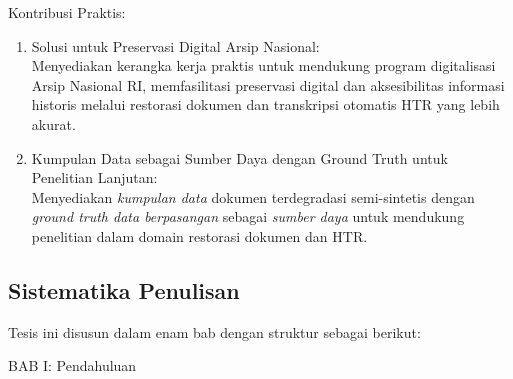 \documentclass[12pt,a4paper]{book}
\begin{document}
\vspace{0.5em}



Kontribusi Praktis:
\begin{enumerate}[label=\arabic*., leftmargin=1cm]
    \item Solusi untuk Preservasi Digital Arsip Nasional: \\
    Menyediakan kerangka kerja praktis untuk mendukung program digitalisasi Arsip Nasional RI, memfasilitasi preservasi digital dan aksesibilitas informasi historis melalui restorasi dokumen dan transkripsi otomatis HTR yang lebih akurat.

    \item Kumpulan Data sebagai Sumber Daya dengan Ground Truth untuk Penelitian Lanjutan: \\
    Menyediakan \textit{kumpulan data} dokumen terdegradasi semi-sintetis dengan \textit{ground truth data berpasangan} sebagai \textit{sumber daya} untuk mendukung penelitian dalam domain restorasi dokumen dan HTR.
\end{enumerate}

\vspace{0.8em}
\subsection{Sistematika Penulisan}
\label{subsec:sistematika}

Tesis ini disusun dalam enam bab dengan struktur sebagai berikut:

\vspace{0.5em}
BAB I: Pendahuluan
\end{document}
